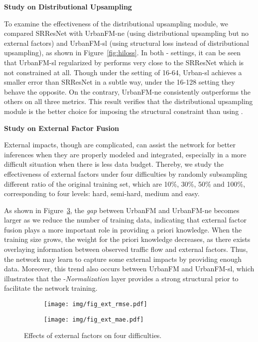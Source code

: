 \vspace{2em}
\noindent\textbf{Study on Distributional Upsampling}

\noindent To examine the effectiveness of the distributional upsampling module, we compared SRResNet with UrbanFM-ne (using distributional upsampling but no external factors) and UrbanFM-sl (using structural loss instead of distributional upsampling), as shown in Figure~\ref{fig:hiloss}. In both - settings, it can be seen that UrbanFM-sl regularized by  performs very close to the SRResNet which is not constrained at all. Though under the setting of 16-64, Urban-sl achieves a smaller error than SRResNet in a subtle way, under the 16-128 setting they behave the opposite. On the contrary, UrbanFM-ne consistently outperforms the others on all three metrics. This result verifies that the distributional upsampling module is the better choice for imposing the structural constraint than using .

\vspace{1mm}
\noindent\textbf{Study on External Factor Fusion}

\noindent External impacts, though are complicated, can assist the network for better inferences when they are properly modeled and integrated, especially in a more difficult situation when there is less data budget. Thereby, we study the effectiveness of external factors under four difficulties by randomly subsampling different ratio of the original training set, which are 10\%, 30\%, 50\% and 100\%, corresponding to four levels: hard, semi-hard, medium and easy.

As shown in Figure~\ref{fig:ext_effect}, the \textit{gap} between UrbanFM and UrbanFM-ne becomes larger as we reduce the number of training data, indicating that external factor fusion plays a more important role in providing a priori knowledge. When the training size grows, the weight for the priori knowledge decreases, as there exists overlaying information between observed traffic flow and external factors. Thus, the network may learn to capture some external impacts by providing enough data. Moreover, this trend also occurs between UrbanFM and UrbanFM-sl, which illustrates that the -\textit{Normalization} layer provides a strong structural prior to facilitate the network training.


\begin{figure}[h!]
	\centering
	\begin{subfigure}[b]{0.225\textwidth}
		\texttt{[image: img/fig\_ext\_rmse.pdf]}	
		\label{fig:ext_rmse}
	\end{subfigure}
	\hspace{1mm}
	\begin{subfigure}[b]{0.225\textwidth}
		\texttt{[image: img/fig\_ext\_mae.pdf]}
		\label{fig:ext_mae}
	\end{subfigure}
	\vspace{-1em}
	\caption{Effects of external factors on four difficulties.}
	\label{fig:ext_effect}
\end{figure}



